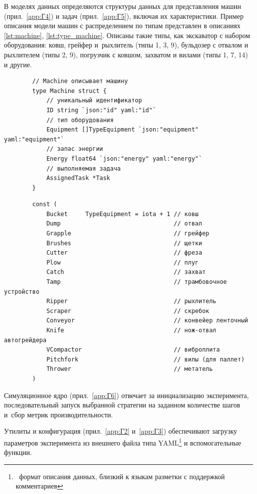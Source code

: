 В моделях данных определяются структуры данных для представления машин (прил.~\ref{app:Г4}) и задач (прил.~\ref{app:Г5}), включая их характеристики. Пример описания модели машин с распределением по типам представлен в описаниях \ref{lst:machine}, \ref{lst:type_machine}. Описаны такие типы, как экскаватор с набором оборудования: ковш, грейфер и~рыхлитель (типы 1, 3, 9), бульдозер с отвалом и рыхлителем (типы 2, 9), погрузчик с ковшом, захватом и вилами (типы 1, 7, 14) и другие.

\begin{ListingEnv}[!ht]
	\caption{Модель данных машин}\label{lst:machine}
	\begin{lstlisting}
		// Machine описывает машину
		type Machine struct {
			// уникальный идентификатор
			ID string `json:"id" yaml:"id"`
			// тип оборудования
			Equipment []TypeEquipment `json:"equipment" yaml:"equipment"`
			// запас энергии
			Energy float64 `json:"energy" yaml:"energy"`
			// выполняемая задача
			AssignedTask *Task
		}
	\end{lstlisting}
\end{ListingEnv}%

\begin{ListingEnv}[!ht]
	\caption{Описание типов оборудования}\label{lst:type_machine}
	\begin{lstlisting}
		const (
			Bucket     TypeEquipment = iota + 1 // ковш
			Dump                                // отвал
			Grapple                             // грейфер
			Brushes                             // щетки
			Cutter                              // фреза
			Plow                                // плуг
			Catch                               // захват
			Tamp                                // трамбовочное устройство
			Ripper                              // рыхлитель
			Scraper                             // скребок
			Conveyor                            // конвейер ленточный
			Knife                               // нож-отвал автогрейдера
			VCompactor                          // виброплита
			Pitchfork                           // вилы (для паллет)
			Thrower                             // метатель
		)
	\end{lstlisting}
\end{ListingEnv}%

Симуляционное ядро (прил.~\ref{app:Г6}) отвечает за инициализацию эксперимента, последовательный запуск выбранной стратегии на заданном количестве шагов и~сбор метрик производительности.

Утилиты и конфигурация (прил.~\ref{app:Г2} и~\ref{app:Г3}) обеспечивают загрузку параметров эксперимента из внешнего файла типа YAML\footnote{\  формат описания данных, близкий к языкам разметки с поддержкой комментариев} и вспомогательные функции.


